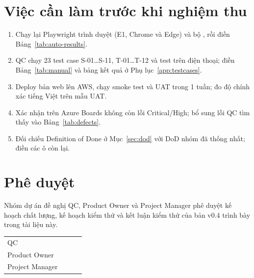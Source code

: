 \documentclass[12pt,a4paper]{report}
\begin{document}
\section{Việc cần làm trước khi nghiệm thu}

\begin{enumerate}
  \item Chạy lại Playwright trình duyệt (E1, Chrome và Edge) và bộ , rồi điền
        Bảng~\ref{tab:auto-results}.
  \item QC chạy 23 test case S-01\ldots S-11, T-01\ldots T-12 và test trên điện thoại; điền Bảng~\ref{tab:manual} và
        bảng kết quả ở Phụ lục~\ref{app:testcases}.
  \item Deploy bản web lên AWS, chạy smoke test và UAT trong 1 tuần; đo độ chính xác tiếng Việt trên mẫu UAT.
  \item Xác nhận trên Azure Boards không còn lỗi Critical/High; bổ sung lỗi QC tìm thấy vào Bảng~\ref{tab:defects}.
  \item Đối chiếu Definition of Done ở Mục~\ref{sec:dod} với DoD nhóm đã thống nhất; điền các ô \canDien{} còn lại.
\end{enumerate}

\section{Phê duyệt}

Nhóm dự án đề nghị QC, Product Owner và Project Manager phê duyệt kế hoạch chất lượng, kế hoạch kiểm thử và kết luận
kiểm thử của bản v0.4 trình bày trong tài liệu này.

\begin{table}[H]
  \centering
  \renewcommand{\arraystretch}{2.4}
  \begin{tabularx}{\linewidth}{@{}P{3.6cm}LP{3.2cm}P{2.6cm}@{}}
    \toprule
     &  &  &  \\
    \midrule
    QC & & & \\
    Product Owner & & & \\
    Project Manager & & & \\
    \bottomrule
  \end{tabularx}
\end{table}
\end{document}
